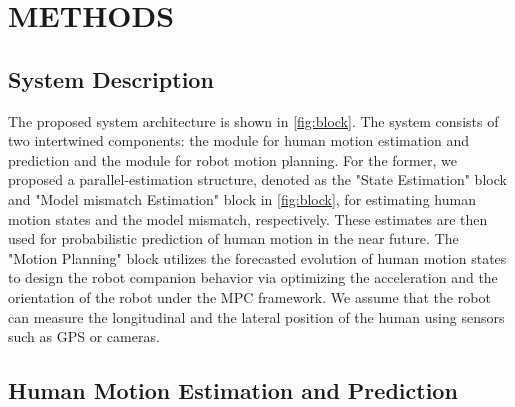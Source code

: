 \documentclass[journal]{IEEEtran}
\DeclareRobustCommand{\clnote}[1]{\ifthenelse{\boolean{include-notes}}%
{\textcolor{orange}{\textbf{CL: #1}}}{}}
\begin{document}
	\section{METHODS} \label{sec:framework}
    \subsection{System Description}\label{sec:description}
    The proposed system architecture is shown in \cref{fig:block}. 
    The system consists of two intertwined components: the module for human motion estimation and prediction and the module for robot motion planning.
   For the former, we proposed a parallel-estimation structure, denoted as the "State Estimation" block and "Model mismatch Estimation" block in \cref{fig:block}, for estimating human motion states and the model mismatch, respectively. 
    These estimates are then used for probabilistic prediction of human motion in the near future. %
   The "Motion Planning" block utilizes the forecasted evolution of human motion states to design the robot companion behavior via optimizing the acceleration and the orientation of the robot under the MPC framework. 
    We assume that the robot can measure the longitudinal and the lateral position of the human using sensors such as GPS or cameras.     
	
	\subsection{Human Motion Estimation and Prediction}\label{subsec:human_track}
\end{document}

